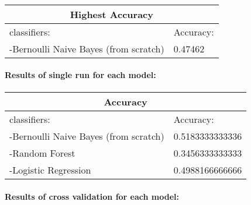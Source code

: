 \documentclass[12pt]{report}
\begin{document}
	\paragraph{}
	\begin{center}
		\begin{tabular}{ |p{3cm}||p{3cm}| }
			\hline
			\multicolumn{2}{|c|}{Highest Accuracy} \\
			\hline
			classifiers:& Accuracy:\\
			\hline
			-Bernoulli Naive Bayes (from scratch)   & 0.47462\\
			\hline
		\end{tabular}
	\end{center}
	
	\paragraph{}
	\paragraph{Results of single run for each model:}
	\paragraph{}
	
	\begin{center}
		\begin{tabular}{ |p{3cm}||p{3cm}| }
			\hline
			\multicolumn{2}{|c|}{Accuracy} \\
			\hline
			classifiers:& Accuracy:\\
			\hline
			-Bernoulli Naive Bayes (from scratch)   & 0.5183333333336\\
			-Random Forest&   0.3456333333333\\
			-Logistic Regression &0.4988166666666\\
			\hline
		\end{tabular}
	\end{center}
	\paragraph{}
	\paragraph{Results of cross validation for each model:}
\end{document}
